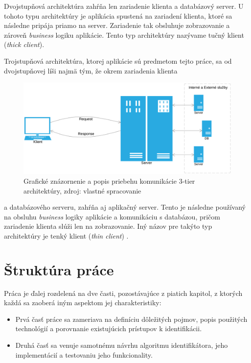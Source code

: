 \documentclass[
  printed, %
  table,   %
  lof,     %
  nolot,   %
  nocover
]{fithesis3}
\begin{document}
Dvojstupňová architektúra zahŕňa len zariadenie klienta a databázový server.
U tohoto typu architektúry je aplikácia spustená na zariadení klienta, ktoré sa
následne pripája priamo na server. Zariadenie tak obsluhuje zobrazovanie a zároveň
\textit{business} logiku aplikácie. Tento typ architektúry
nazývame tučný klient (\textit{thick client}). 

Trojstupňová architektúra, ktorej aplikácie sú predmetom tejto práce, sa od
dvojstupňovej líši najmä tým, že okrem zariadenia klienta

\begin{figure}[H]
  \centering
    \includegraphics[width=\textwidth]{images/C-S-thin.png}
  \caption{Grafické znázornenie a popis priebehu komunikácie 3-tier architektúry,
  zdroj: vlastné spracovanie}
  \label{fig:cs-thin}
\end{figure}

\noindent a databázového serveru, zahŕňa aj aplikačný server. Tento je následne používaný na obsluhu
\textit{business} logiky aplikácie a komunikáciu s databázou, pričom zariadenie
klienta slúži len na zobrazovanie. Iný názov pre takýto typ architektúry je tenký
klient (\textit{thin client}) \cite{Oluwatosin:2014:CS}.

\section{Štruktúra práce}
Práca je ďalej rozdelená na dve časti, pozostávajúce z piatich kapitol, z ktorých každá sa zaoberá iným aspektom
jej charakteristiky:
\begin{itemize}
\item Prvá časť práce sa zameriava na
definíciu dôležitých pojmov, popis použitých technológií a porovnanie existujúcich prístupov k identifikácii.
\item Druhá časť sa venuje samotnému návrhu algoritmu identifikátora, jeho implementácií a testovaniu jeho funkcionality.
\end{itemize}
\end{document}
